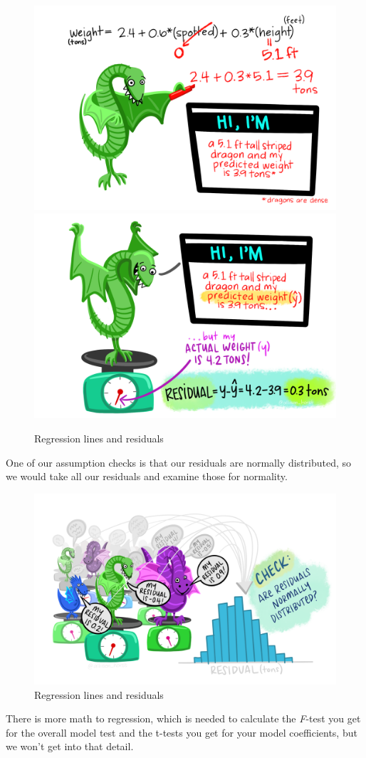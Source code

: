 \documentclass[
]{book}
\begin{document}
\begin{figure}

{\centering \includegraphics[width=0.49\linewidth]{images/13-regression/dragon_predict_mlr} \includegraphics[width=0.49\linewidth]{images/13-regression/dragon_residual} 

}

\caption{Regression lines and residuals}\label{fig:unnamed-chunk-4}
\end{figure}

One of our assumption checks is that our residuals are normally distributed, so we would take all our residuals and examine those for normality.

\begin{figure}

{\centering \includegraphics[width=0.49\linewidth]{images/13-regression/dragon_residual_distribution} 

}

\caption{Regression lines and residuals}\label{fig:unnamed-chunk-5}
\end{figure}

There is more math to regression, which is needed to calculate the \emph{F}-test you get for the overall model test and the t-tests you get for your model coefficients, but we won't get into that detail.
\end{document}
